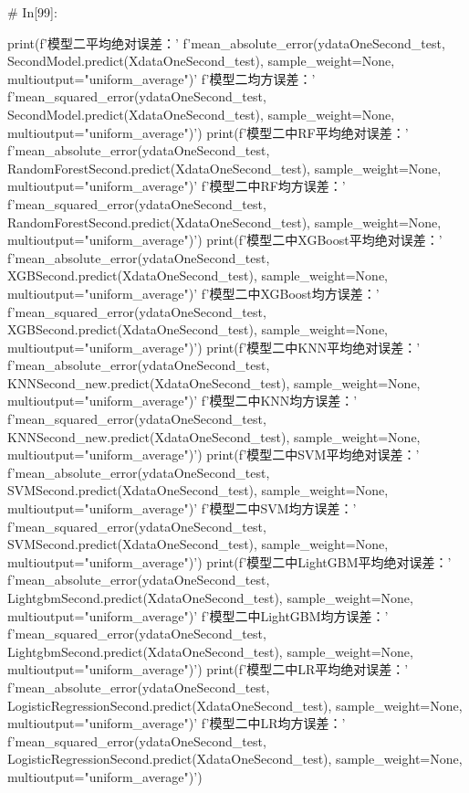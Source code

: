 \documentclass{MathorCupmodeling}
\begin{document}
\begin{python}
# In[99]:


print(f'模型二平均绝对误差：'
      f'{mean_absolute_error(ydataOneSecond_test, SecondModel.predict(XdataOneSecond_test), sample_weight=None, multioutput="uniform_average")}\n'
      f'模型二均方误差：'
      f'{mean_squared_error(ydataOneSecond_test, SecondModel.predict(XdataOneSecond_test), sample_weight=None, multioutput="uniform_average")}')
print(f'模型二中RF平均绝对误差：'
      f'{mean_absolute_error(ydataOneSecond_test, RandomForestSecond.predict(XdataOneSecond_test), sample_weight=None, multioutput="uniform_average")}\n'
      f'模型二中RF均方误差：'
      f'{mean_squared_error(ydataOneSecond_test, RandomForestSecond.predict(XdataOneSecond_test), sample_weight=None, multioutput="uniform_average")}')
print(f'模型二中XGBoost平均绝对误差：'
      f'{mean_absolute_error(ydataOneSecond_test, XGBSecond.predict(XdataOneSecond_test), sample_weight=None, multioutput="uniform_average")}\n'
      f'模型二中XGBoost均方误差：'
      f'{mean_squared_error(ydataOneSecond_test, XGBSecond.predict(XdataOneSecond_test), sample_weight=None, multioutput="uniform_average")}')
print(f'模型二中KNN平均绝对误差：'
      f'{mean_absolute_error(ydataOneSecond_test, KNNSecond_new.predict(XdataOneSecond_test), sample_weight=None, multioutput="uniform_average")}\n'
      f'模型二中KNN均方误差：'
      f'{mean_squared_error(ydataOneSecond_test, KNNSecond_new.predict(XdataOneSecond_test), sample_weight=None, multioutput="uniform_average")}')
print(f'模型二中SVM平均绝对误差：'
      f'{mean_absolute_error(ydataOneSecond_test, SVMSecond.predict(XdataOneSecond_test), sample_weight=None, multioutput="uniform_average")}\n'
      f'模型二中SVM均方误差：'
      f'{mean_squared_error(ydataOneSecond_test, SVMSecond.predict(XdataOneSecond_test), sample_weight=None, multioutput="uniform_average")}')
print(f'模型二中LightGBM平均绝对误差：'
      f'{mean_absolute_error(ydataOneSecond_test, LightgbmSecond.predict(XdataOneSecond_test), sample_weight=None, multioutput="uniform_average")}\n'
      f'模型二中LightGBM均方误差：'
      f'{mean_squared_error(ydataOneSecond_test, LightgbmSecond.predict(XdataOneSecond_test), sample_weight=None, multioutput="uniform_average")}')
print(f'模型二中LR平均绝对误差：'
      f'{mean_absolute_error(ydataOneSecond_test, LogisticRegressionSecond.predict(XdataOneSecond_test), sample_weight=None, multioutput="uniform_average")}\n'
      f'模型二中LR均方误差：'
      f'{mean_squared_error(ydataOneSecond_test, LogisticRegressionSecond.predict(XdataOneSecond_test), sample_weight=None, multioutput="uniform_average")}')



\end{python}
\end{document}
